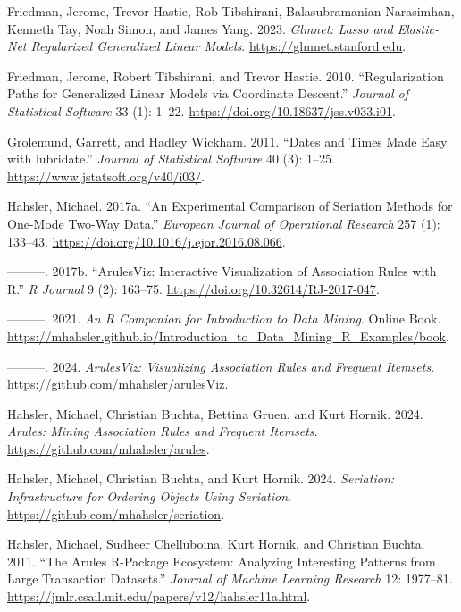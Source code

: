 \documentclass[
  notitlepage]{book}
\newlength{\cslhangindent}
\newenvironment{cslreferences}%
  {\setlength{\parindent}{0pt}%
  \everypar{\setlength{\hangindent}{\cslhangindent}}\ignorespaces}%
  {\par}
\begin{document}
\begin{cslreferences}
\leavevmode\hypertarget{ref-R-glmnet}{}%
Friedman, Jerome, Trevor Hastie, Rob Tibshirani, Balasubramanian Narasimhan, Kenneth Tay, Noah Simon, and James Yang. 2023. \emph{Glmnet: Lasso and Elastic-Net Regularized Generalized Linear Models}. \url{https://glmnet.stanford.edu}.

\leavevmode\hypertarget{ref-glmnet2010}{}%
Friedman, Jerome, Robert Tibshirani, and Trevor Hastie. 2010. ``Regularization Paths for Generalized Linear Models via Coordinate Descent.'' \emph{Journal of Statistical Software} 33 (1): 1--22. \url{https://doi.org/10.18637/jss.v033.i01}.

\leavevmode\hypertarget{ref-lubridate2011}{}%
Grolemund, Garrett, and Hadley Wickham. 2011. ``Dates and Times Made Easy with lubridate.'' \emph{Journal of Statistical Software} 40 (3): 1--25. \url{https://www.jstatsoft.org/v40/i03/}.

\leavevmode\hypertarget{ref-seriation2017}{}%
Hahsler, Michael. 2017a. ``An Experimental Comparison of Seriation Methods for One-Mode Two-Way Data.'' \emph{European Journal of Operational Research} 257 (1): 133--43. \url{https://doi.org/10.1016/j.ejor.2016.08.066}.

\leavevmode\hypertarget{ref-arulesViz2017}{}%
---------. 2017b. ``ArulesViz: Interactive Visualization of Association Rules with R.'' \emph{R Journal} 9 (2): 163--75. \url{https://doi.org/10.32614/RJ-2017-047}.

\leavevmode\hypertarget{ref-Hahsler2021}{}%
---------. 2021. \emph{An R Companion for Introduction to Data Mining}. Online Book. \url{https://mhahsler.github.io/Introduction_to_Data_Mining_R_Examples/book}.

\leavevmode\hypertarget{ref-R-arulesViz}{}%
---------. 2024. \emph{ArulesViz: Visualizing Association Rules and Frequent Itemsets}. \url{https://github.com/mhahsler/arulesViz}.

\leavevmode\hypertarget{ref-R-arules}{}%
Hahsler, Michael, Christian Buchta, Bettina Gruen, and Kurt Hornik. 2024. \emph{Arules: Mining Association Rules and Frequent Itemsets}. \url{https://github.com/mhahsler/arules}.

\leavevmode\hypertarget{ref-R-seriation}{}%
Hahsler, Michael, Christian Buchta, and Kurt Hornik. 2024. \emph{Seriation: Infrastructure for Ordering Objects Using Seriation}. \url{https://github.com/mhahsler/seriation}.

\leavevmode\hypertarget{ref-arules2011}{}%
Hahsler, Michael, Sudheer Chelluboina, Kurt Hornik, and Christian Buchta. 2011. ``The Arules R-Package Ecosystem: Analyzing Interesting Patterns from Large Transaction Datasets.'' \emph{Journal of Machine Learning Research} 12: 1977--81. \url{https://jmlr.csail.mit.edu/papers/v12/hahsler11a.html}.


\end{cslreferences}
\end{document}
